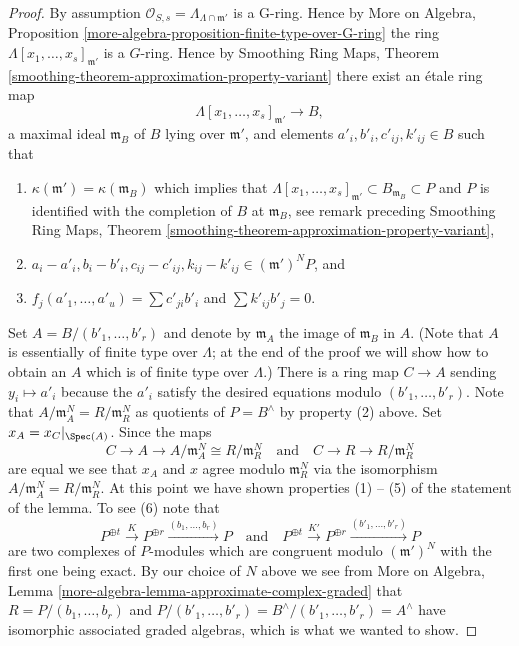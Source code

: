 \begin{proof}
\medskip\noindent
By assumption $\mathcal{O}_{S, s} = \Lambda_{\Lambda \cap \mathfrak m'}$ is
a G-ring. Hence by More on Algebra, Proposition
\ref{more-algebra-proposition-finite-type-over-G-ring}
the ring $\Lambda[x_1, \ldots, x_s]_{\mathfrak m'}$ is a $G$-ring.
Hence by Smoothing Ring Maps, Theorem
\ref{smoothing-theorem-approximation-property-variant}
there exist an \'etale ring map
$$
\Lambda[x_1, \ldots, x_s]_{\mathfrak m'} \to B,
$$
a maximal ideal $\mathfrak m_B$ of $B$ lying over $\mathfrak m'$, and
elements $a'_i, b'_i, c'_{ij}, k'_{ij} \in B$ such that
\begin{enumerate}
\item $\kappa(\mathfrak m') = \kappa(\mathfrak m_B)$ which implies
that $\Lambda[x_1, \ldots, x_s]_{\mathfrak m'} \subset B_{\mathfrak m_B}
\subset P$ and $P$ is identified with the completion of $B$ at
$\mathfrak m_B$, see remark preceding Smoothing Ring Maps, Theorem
\ref{smoothing-theorem-approximation-property-variant},
\item $a_i - a'_i, b_i - b'_i, c_{ij} - c'_{ij}, k_{ij} - k'_{ij} \in
(\mathfrak m')^N P$, and
\item $f_j(a'_1, \ldots, a'_u) = \sum c'_{ji} b'_i$ and $\sum k'_{ij}b'_j = 0$.
\end{enumerate}
Set $A = B/(b'_1, \ldots, b'_r)$ and denote by $\mathfrak m_A$ the
image of $\mathfrak m_B$ in $A$. (Note that $A$ is essentially of finite
type over $\Lambda$; at the end of the proof we will show how to obtain
an $A$ which is of finite type over $\Lambda$.) There is a ring map
$C \to A$ sending $y_i \mapsto a'_i$ because the $a'_i$ satisfy
the desired equations modulo $(b'_1, \ldots, b'_r)$.
Note that $A/\mathfrak m_A^N = R/\mathfrak m_R^N$ as quotients of
$P = B^\wedge$ by property (2) above. Set $x_A = x_C|_{\Spec(A)}$.
Since the maps
$$
C \to A \to A/\mathfrak m_A^N \cong R/\mathfrak m_R^N
\quad\text{and}\quad
C \to R \to R/\mathfrak m_R^N
$$
are equal we see that $x_A$ and $x$ agree modulo $\mathfrak m_R^N$
via the isomorphism $A/\mathfrak m_A^N = R/\mathfrak m_R^N$. At this
point we have shown properties (1) -- (5) of the statement of the lemma.
To see (6) note that
$$
P^{\oplus t} \xrightarrow{K}
P^{\oplus r} \xrightarrow{(b_1, \ldots, b_r)}
P
\quad\text{and}\quad
P^{\oplus t} \xrightarrow{K'}
P^{\oplus r} \xrightarrow{(b'_1, \ldots, b'_r)}
P
$$
are two complexes of $P$-modules which are congruent modulo
$(\mathfrak m')^N$ with the first one being exact. By our choice of $N$
above we see from
More on Algebra, Lemma \ref{more-algebra-lemma-approximate-complex-graded}
that $R = P/(b_1, \ldots, b_r)$ and
$P/(b'_1, \ldots, b'_r) = B^\wedge/(b'_1, \ldots, b'_r) = A^\wedge$
have isomorphic associated graded algebras, which is what we wanted to show.


\end{proof}
